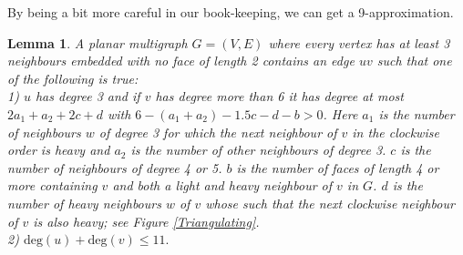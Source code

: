 \documentclass{article}
\newcommand{\0}{\mathbb{0}}
\newcommand{\1}{\mathbb{1}}
\newtheorem{lemma}[theorem]{Lemma}
\begin{document}
 By being a bit more careful in our book-keeping, we can get a 9-approximation.
 
 \begin{lemma}\label{light+}  \cite{JV13} 
A planar multigraph $ G=(V,E)$ where every vertex has  at least 3 neighbours embedded with no face of length 2 contains  an  edge $uv$ such that one of the following is true: \\
1) $u$ has degree 3 and if $v$ has degree more than 6 it has degree at most $2a_1 + a_2 + 2c +d $ with $ 6-(a_1+a_2) -1.5c -d -b > 0 $. Here $ a_1 $ is the number of neighbours $w $ of degree 3 for which  the next neighbour of $v$  in the clockwise order is heavy and $a_2$ is the number of other neighbours of degree 3.  %
$c$ is the number of neighbours of degree 4 or 5. $b$ is the number of faces of length 4 or more containing $v$ and both a light and heavy neighbour of $v$ in $G$. $d$ is the number of heavy neighbours $w$ of $v$ whose such that the next clockwise neighbour of $v$ is also heavy; see Figure \ref{Triangulating}. \\ %
2) $  \text{deg}(u) + \text{deg}(v) \leq  11. $ %

\end{lemma}
\end{document}
